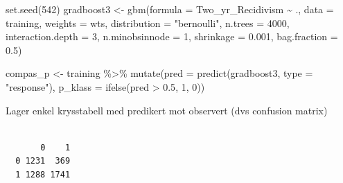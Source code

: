 \documentclass[
  letterpaper,
  DIV=11,
  numbers=noendperiod]{scrreprt}
\newenvironment{Shaded}{\begin{snugshade}}{\end{snugshade}}
\newcommand{\AttributeTok}[1]{\textcolor[rgb]{0.40,0.45,0.13}{#1}}
\newcommand{\DecValTok}[1]{\textcolor[rgb]{0.68,0.00,0.00}{#1}}
\newcommand{\FloatTok}[1]{\textcolor[rgb]{0.68,0.00,0.00}{#1}}
\newcommand{\FunctionTok}[1]{\textcolor[rgb]{0.28,0.35,0.67}{#1}}
\newcommand{\NormalTok}[1]{\textcolor[rgb]{0.00,0.23,0.31}{#1}}
\newcommand{\OtherTok}[1]{\textcolor[rgb]{0.00,0.23,0.31}{#1}}
\newcommand{\SpecialCharTok}[1]{\textcolor[rgb]{0.37,0.37,0.37}{#1}}
\newcommand{\StringTok}[1]{\textcolor[rgb]{0.13,0.47,0.30}{#1}}
\begin{document}
\begin{Shaded}
\begin{Highlighting}[]
\FunctionTok{set.seed}\NormalTok{(}\DecValTok{542}\NormalTok{)}
\NormalTok{gradboost3 }\OtherTok{\textless{}{-}} \FunctionTok{gbm}\NormalTok{(}\AttributeTok{formula =}\NormalTok{ Two\_yr\_Recidivism }\SpecialCharTok{\textasciitilde{}}\NormalTok{ .,}
                 \AttributeTok{data =}\NormalTok{ training,}
                 \AttributeTok{weights =}\NormalTok{ wts, }
                 \AttributeTok{distribution =} \StringTok{"bernoulli"}\NormalTok{,}
                 \AttributeTok{n.trees =} \DecValTok{4000}\NormalTok{,}
                 \AttributeTok{interaction.depth =} \DecValTok{3}\NormalTok{,}
                 \AttributeTok{n.minobsinnode =} \DecValTok{1}\NormalTok{,}
                 \AttributeTok{shrinkage =} \FloatTok{0.001}\NormalTok{,}
                 \AttributeTok{bag.fraction =} \FloatTok{0.5}\NormalTok{)}
\end{Highlighting}
\end{Shaded}

\begin{Shaded}
\begin{Highlighting}[]
\NormalTok{compas\_p }\OtherTok{\textless{}{-}}\NormalTok{ training }\SpecialCharTok{\%\textgreater{}\%} 
  \FunctionTok{mutate}\NormalTok{(}\AttributeTok{pred =} \FunctionTok{predict}\NormalTok{(gradboost3, }\AttributeTok{type =} \StringTok{"response"}\NormalTok{), }
         \AttributeTok{p\_klass =} \FunctionTok{ifelse}\NormalTok{(pred }\SpecialCharTok{\textgreater{}} \FloatTok{0.5}\NormalTok{, }\DecValTok{1}\NormalTok{, }\DecValTok{0}\NormalTok{))}
\end{Highlighting}
\end{Shaded}

Lager enkel krysstabell med predikert mot observert (dvs confusion
matrix)

\begin{Shaded}
\end{Shaded}

\begin{verbatim}
   
       0    1
  0 1231  369
  1 1288 1741
\end{verbatim}
\end{document}
